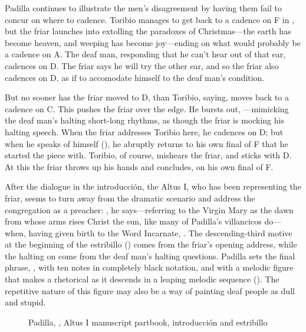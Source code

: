 Padilla continues to illustrate the men's disagreement by having them fail to concur on where to cadence.
Toribio manages to get back to a cadence on F in , but the friar launches into extolling the paradoxes of Christmas---the earth has become heaven, and weeping has become joy---ending on what would probably be a  cadence on A.
The deaf man, responding that he can't hear out of that ear, cadences on D.
The friar says he will try the other ear, and so the friar also cadences on D, as if to accomodate himself to the deaf man's condition.

But no sooner has the friar moved to D, than Toribio, saying,  moves back to a cadence on C.
This pushes the friar over the edge.
He bursts out, ---mimicking the deaf man's halting short-long rhythms, as though the friar is mocking his halting speech.
When the friar addresses Toribio here, he cadences on D; but when he speaks of himself (), he abruptly returns to his own final of F that he started the piece with.
Toribio, of course, mishears the friar, and sticks with D.
At this the friar throws up his hands and concludes,  on his own final of F.

After the dialogue in the introducción, the Altus I, who has been representing the friar, seems to turn away from the dramatic scenario and address the congregation as a preacher: , he says---referring to the Virgin Mary as the dawn from whose arms rises Christ the sun, like many of Padilla's villancicos do---when, having given birth to the Word Incarnate, .
The descending-third motive at the beginning of the estribillo () comes from the friar's opening address, while the halting  on  come from the deaf man's halting questions.
Padilla sets the final phrase, , with ten notes in completely black notation, and with a melodic figure that makes a rhetorical  as it descends in a leaping melodic sequence ().
The repetitive nature of this figure may also be a way of painting deaf people as dull and stupid.

\begin{figure}
\caption{Padilla, , Altus I manuscript partbook, introducción and estribillo}
\label{figure:Padilla-Sordo-MS-estribillo}
\end{figure}

